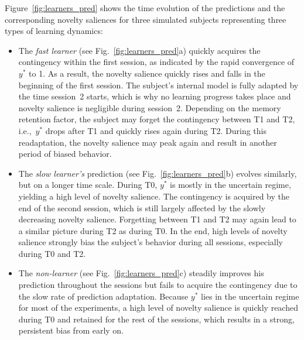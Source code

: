 \documentclass[a4paper]{scrreprt}
\begin{document}
Figure~\ref{fig:learners_pred} shows the time evolution of the predictions and the corresponding novelty saliences for three simulated subjects representing three types of learning dynamics:
\begin{itemize}
\item The \textit{fast learner} (see Fig.~\ref{fig:learners_pred}a) quickly acquires the contingency within the first session, as indicated by the rapid convergence of $y^*$ to 1. As a result, the novelty salience quickly rises and falls in the beginning of the first session. The subject's internal model is fully adapted by the time session~2 starts, which is why no learning progress takes place and novelty salience is negligible during session~2. Depending on the memory retention factor, the subject may forget the contingency between T1 and T2, i.e.,~$y^*$ drops after T1 and quickly rises again during T2. During this readaptation, the novelty salience may peak again and result in another period of biased behavior.
\item The \textit{slow learner's} prediction (see Fig.~\ref{fig:learners_pred}b) evolves similarly, but on a longer time scale. During T0, $y^*$ is mostly in the uncertain regime, yielding a high level of novelty salience. The contingency is acquired by the end of the second session, which is still largely affected by the slowly decreasing novelty salience. Forgetting between T1 and T2 may again lead to a similar picture during T2 as during T0. In the end, high levels of novelty salience strongly bias the subject's behavior during all sessions, especially during T0 and T2.
\item The \textit{non-learner} (see Fig.~\ref{fig:learners_pred}c) steadily improves his prediction throughout the sessions but fails to acquire the contingency due to the slow rate of prediction adaptation. Because $y^*$ lies in the uncertain regime for most of the experiments, a high level of novelty salience is quickly reached during T0 and retained for the rest of the sessions, which results in a strong, persistent bias from early on.
\end{itemize}
\end{document}
